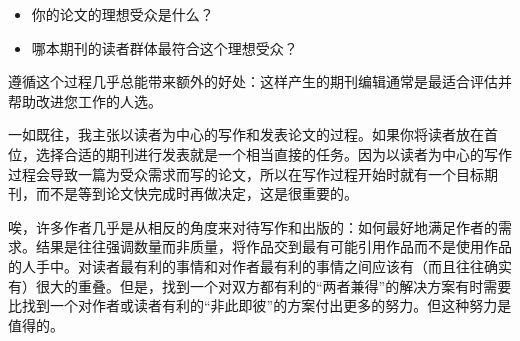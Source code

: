 \begin{itemize}
\item 你的论文的理想受众是什么？
\item 哪本期刊的读者群体最符合这个理想受众？
\end{itemize}

遵循这个过程几乎总能带来额外的好处：这样产生的期刊编辑通常是最适合评估并帮助改进您工作的人选。

一如既往，我主张以读者为中心的写作和发表论文的过程。如果你将读者放在首位，选择合适的期刊进行发表就是一个相当直接的任务。因为以读者为中心的写作过程会导致一篇为受众需求而写的论文，所以在写作过程开始时就有一个目标期刊，而不是等到论文快完成时再做决定，这是很重要的。

唉，许多作者几乎是从相反的角度来对待写作和出版的：如何最好地满足作者的需求。结果是往往强调数量而非质量，将作品交到最有可能引用作品而不是使用作品的人手中。对读者最有利的事情和对作者最有利的事情之间应该有（而且往往确实有）很大的重叠。但是，找到一个对双方都有利的“两者兼得”的解决方案有时需要比找到一个对作者或读者有利的“非此即彼”的方案付出更多的努力。但这种努力是值得的。

